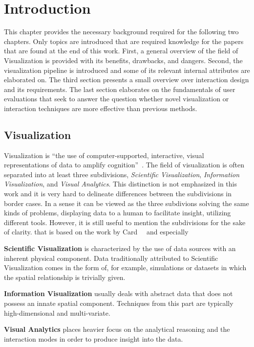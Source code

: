 \chapter{Introduction} \label{cha:intro}
This chapter provides the necessary background required for the following two chapters.  Only topics are introduced that are required knowledge for the papers that are found at the end of this work.  First, a general overview of the field of Visualization is provided with its benefits, drawbacks, and dangers.  Second, the visualization pipeline is introduced and some of its relevant internal attributes are elaborated on.  The third section presents a small overview over interaction design and its requirements.  The last section elaborates on the fundamentals of user evaluations that seek to answer the question whether novel visualization or interaction techniques are more effective than previous methods.

\section{Visualization} \label{cha:intro:v}
Visualization is ``the use of computer-supported, interactive, visual representations of data to amplify cognition''~\cite{card1999readings}.  The field of visualization is often separated into at least three subdivisions, \emph{Scientific Visualization}, \emph{Information Visualization}, and \emph{Visual Analytics}.  This distinction is not emphasized in this work and it is very hard to delineate differences between the subdivisions in border cases.  In a sense it can be viewed as the three subdivions solving the same kinds of problems, displaying data to a human to facilitate insight, utilizing different tools.  However, it is still useful to mention the subdivisions for the sake of clarity. that is based on the work by Card~\etal~\cite{card1999readings} and especially 

\textbf{Scientific Visualization } is characterized by the use of data sources with an inherent physical component.  Data traditionally attributed to Scientific Visualization comes in the form of, for example, simulations or datasets in which the spatial relationship is trivially given.

\textbf{Information Visualization } usually deals with abstract data that does not possess an innate spatial component.  Techniques from this part are typically high-dimensional and multi-variate.

\textbf{Visual Analytics } places heavier focus on the analytical reasoning and the interaction modes in order to produce insight into the data. 

